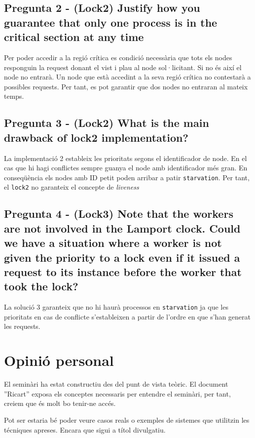 \documentclass[a4paper, 11pt]{article}
\begin{document}
\subsection{Pregunta 2 - (Lock2) Justify how you guarantee that only one process is in the critical section at any time}

Per poder accedir a la regió crítica es condició necessària que tots els nodes responguin la request donant el vist i plau al node sol·licitant. Si no és així el node no entrarà. Un node que està accedint a la seva regió crítica no contestarà a possibles requests. Per tant, es pot garantir que dos nodes no entraran al mateix temps.

\subsection{Pregunta 3 - (Lock2) What is the main drawback of lock2 implementation?}

La implementació 2 estableix les prioritats segons el identificador de node. En el cas que hi hagi conflictes sempre guanya el node amb identificador més gran. En conseqüència els nodes amb ID petit poden arribar a patir \texttt{starvation}. 
Per tant, el \texttt{lock2} no garanteix el concepte de \textit{liveness}

\subsection{Pregunta 4 - (Lock3) Note that the workers are not involved in the Lamport clock. Could we have a situation where a worker is not given the priority to a lock even if it issued a request to its instance before the worker that took the lock?}

La solució 3 garanteix que no hi haurà processos en \texttt{starvation} ja que les prioritats en cas de conflicte s'estableixen a partir de l'ordre en que s'han generat les requests. 

\section{Opinió personal}

El seminàri ha estat constructiu des del punt de vista teòric. El document ''Ricart'' exposa els conceptes necessaris per entendre el seminàri, per tant, creiem que és molt bo tenir-ne accés. 

Pot ser estaria bé poder veure casos reals o exemples de sistemes que utilitzin les técniques apreses. Encara que sigui a títol divulgatiu. 
\end{document}
